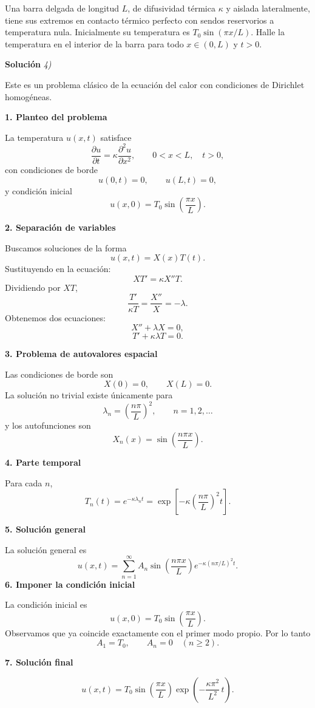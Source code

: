 \documentclass[11pt,spanish]{article}
\newcounter{problema}
\newcommand{\prob}{\stepcounter{problema} \vspace{.5cm} \noindent{\bf Problema \arabic{problema}: }}
\begin{document}
\prob Una barra delgada de longitud $L$, de difusividad térmica $\kappa$ y aislada lateralmente, tiene sus extremos en contacto térmico perfecto con sendos reservorios a temperatura nula. Inicialmente su
temperatura es $T_0 \sin(\pi x/L)$. 
Halle la temperatura en el interior de la barra para todo $x\in (0,L)$ y
$t > 0$.

\vspace{0.5cm}
{\bf Soluci\'on }{\em 4)}
\vspace{0.5cm}

Este es un problema clásico de la ecuación del calor con condiciones de Dirichlet homogéneas.

{\bf 1. Planteo del problema}

La temperatura $u(x,t)$ satisface
$$
\frac{\partial u}{\partial t}
=
\kappa \frac{\partial^2 u}{\partial x^2},
\qquad 0<x<L,\quad t>0,
$$
con condiciones de borde
$$
u(0,t)=0,
\qquad
u(L,t)=0,
$$
y condición inicial
$$
u(x,0)=T_0\sin\left(\frac{\pi x}{L}\right).
$$

{\bf 2. Separación de variables}

Buscamos soluciones de la forma
$$
u(x,t)=X(x)T(t).
$$
Sustituyendo en la ecuación:
$$
XT'
=
\kappa X''T.
$$
Dividiendo por $XT$,
$$
\frac{T'}{\kappa T}
=
\frac{X''}{X}
=
-\lambda.
$$
Obtenemos dos ecuaciones:
$$
X''+\lambda X=0,
$$
$$
T'+\kappa\lambda T=0.
$$

{\bf 3. Problema de autovalores espacial}

Las condiciones de borde son
$$
X(0)=0,
\qquad
X(L)=0.
$$
La solución no trivial existe únicamente para
$$
\lambda_n=\left(\frac{n\pi}{L}\right)^2,
\qquad n=1,2,\ldots
$$
y los autofunciones son
$$
X_n(x)
=
\sin\left(\frac{n\pi x}{L}\right).
$$

{\bf 4. Parte temporal}

Para cada $n$,
$$
T_n(t)
=
e^{-\kappa \lambda_n t}
=
\exp\left[
-\kappa
\left(\frac{n\pi}{L}\right)^2
t
\right].
$$

{\bf 5. Solución general}

La solución general es
$$
u(x,t)
=
\sum_{n=1}^{\infty}
A_n
\sin\left(\frac{n\pi x}{L}\right)
e^{-\kappa (n\pi/L)^2 t}.
$$
{\bf 6. Imponer la condición inicial}

La condición inicial es
$$
u(x,0)
=
T_0
\sin\left(\frac{\pi x}{L}\right).
$$
Observamos que ya coincide exactamente con el primer modo propio.
Por lo tanto
$$
A_1=T_0,
\qquad
A_n=0 \quad (n\ge2).
$$

{\bf 7. Solución final}

$$
\boxed{
u(x,t)
=
T_0
\sin\left(\frac{\pi x}{L}\right)
\exp\left(
-\frac{\kappa\pi^2}{L^2}\,t
\right).
}
$$
\end{document}
